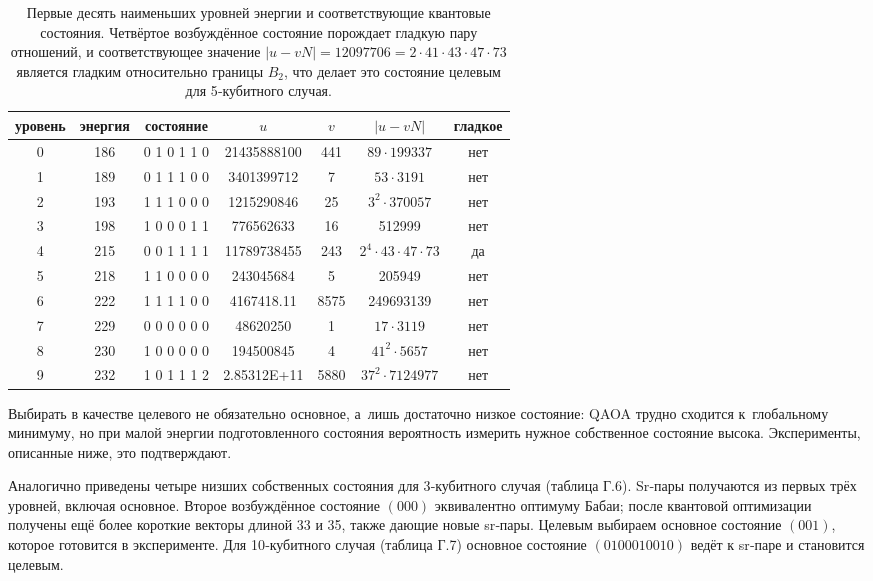 \begin{table}[h]
    \centering
    \caption{
    Первые десять наименьших уровней энергии и соответствующие квантовые
    состояния. Четвёртое возбуждённое состояние порождает гладкую пару
    отношений, и соответствующее значение \( |u-vN| = 12097706 =
    2\cdot41\cdot43\cdot47\cdot73 \) является гладким относительно границы
    \(B_{2}\), что делает это состояние целевым для 5‑кубитного случая.
    }
\begin{tabular}{@{}ccccccc@{}}
\hline\hline
\textbf{уровень} & \textbf{энергия} & \textbf{состояние} &
\(u\) & \(v\) & \(|u-vN|\) & гладкое \\ \hline
0 & 186 & 0 1 0 1 1 0 & 21435888100 &   441 & $89{\cdot}199337$ & нет \\
1 & 189 & 0 1 1 1 0 0 &  3401399712 &    7 & $53{\cdot}3191$   & нет \\
2 & 193 & 1 1 1 0 0 0 & 1215290846 &   25 & $3^{2}{\cdot}370057$ & нет \\
3 & 198 & 1 0 0 0 1 1 &  776562633 &   16 &  512999           & нет \\
4 & 215 & 0 0 1 1 1 1 & 11789738455 & 243 & $2^{4}{\cdot}43{\cdot}47{\cdot}73$ & да \\
5 & 218 & 1 1 0 0 0 0 &  243045684  &    5 &  205949           & нет \\
6 & 222 & 1 1 1 1 0 0 & 4167418.11  & 8575 & 249693139         & нет \\
7 & 229 & 0 0 0 0 0 0 &   48620250 &    1 & $17{\cdot}3119$    & нет \\
8 & 230 & 1 0 0 0 0 0 & 194500845  &    4 & $41^{2}{\cdot}5657$ & нет \\
9 & 232 & 1 0 1 1 1 2 & 2.85312E+11 & 5880 & $37^{2}{\cdot}7124977$ & нет \\
\hline\hline
\end{tabular}
    \label{tab:tab7}
\end{table}

Выбирать в качестве целевого не обязательно основное, а~лишь достаточно низкое
состояние: QAOA трудно сходится к~глобальному минимуму, но при малой энергии
подготовленного состояния вероятность измерить нужное собственное состояние
высока. Эксперименты, описанные ниже, это подтверждают.

Аналогично приведены четыре низших собственных состояния для 3‑кубитного случая
(таблица Г.6). Sr‑пары получаются из первых трёх уровней, включая основное.
Второе возбуждённое состояние $(000)$ эквивалентно оптимуму Бабаи; после
квантовой оптимизации получены ещё более короткие векторы длиной 33 и 35, также
дающие новые sr‑пары. Целевым выбираем основное состояние $(001)$, которое
готовится в эксперименте. Для 10‑кубитного случая (таблица Г.7) основное
состояние $(0100010010)$ ведёт к sr‑паре и становится целевым.

